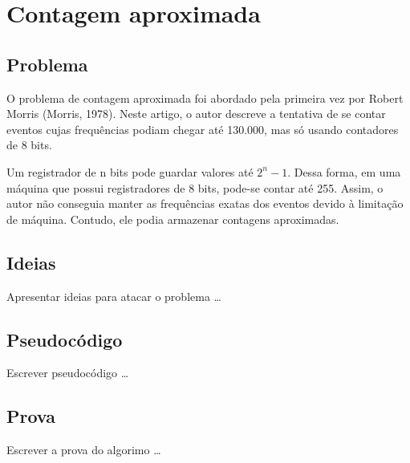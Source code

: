 \chapter{Contagem aproximada}
\label{chap:morris}

\section{Problema}

O problema de contagem aproximada foi abordado pela primeira vez por Robert  Morris (Morris, 1978). 
Neste artigo, o autor descreve a tentativa de se contar eventos cujas frequências podiam chegar até 130.000, mas só usando contadores de 8 bits.

Um registrador de n bits pode guardar valores até $2^n-1$. Dessa forma, em uma máquina que possui registradores de 8 bits, pode-se contar até 255.
Assim, o autor não conseguia manter as frequências exatas dos eventos devido à limitação de máquina. 
Contudo, ele podia armazenar contagens aproximadas.

\section{Ideias}

Apresentar ideias para atacar o problema \dots

\section{Pseudocódigo}

Escrever pseudocódigo \dots

\section{Prova}

Escrever a prova do algorimo \dots
